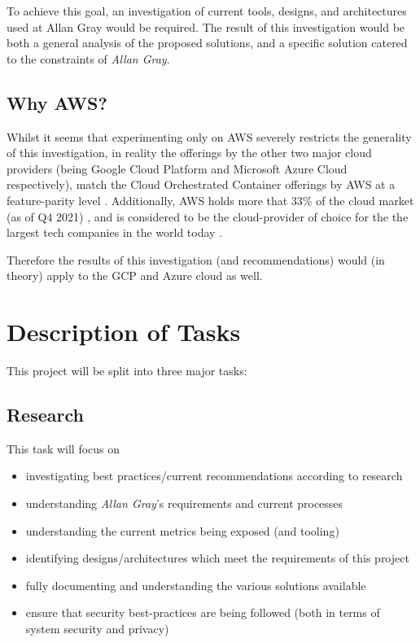 \documentclass[12pt]{article}
\begin{document}
\noindent To achieve this goal, an investigation of current tools, designs, and architectures used at Allan Gray would be required. The result of this investigation would be both a general analysis of the proposed solutions, and a specific solution catered to the constraints of \textit{Allan Gray}.

\subsection{Why AWS?}
Whilst it seems that experimenting only on AWS severely restricts the generality of this investigation, in reality the offerings by the other two major cloud providers (being Google Cloud Platform and Microsoft Azure Cloud respectively), match the Cloud Orchestrated Container offerings by AWS at a feature-parity level \cite{contaier_workloads}. 
Additionally, AWS holds more that 33\% of the cloud market (as of Q4 2021) \cite{aws_cloud_share}, and is considered to be the cloud-provider of choice for the the largest tech companies in the world today \cite{aws_users}. 

Therefore the results of this investigation (and recommendations) would (in theory) apply to the GCP and Azure cloud as well.

\section{Description of Tasks}
This project will be split into three major tasks:
\subsection{Research}
This task will focus on
\begin{itemize}
    \item investigating best practices/current recommendations according to research 
    \item understanding \textit{Allan Gray}'s requirements and current processes
    \item understanding the current metrics being exposed (and tooling)
    \item identifying designs/architectures which meet the requirements of this project 
    \item fully documenting and understanding the various solutions available 
    \item ensure that security best-practices are being followed (both in terms of system security and privacy)
\end{itemize}
\end{document}
